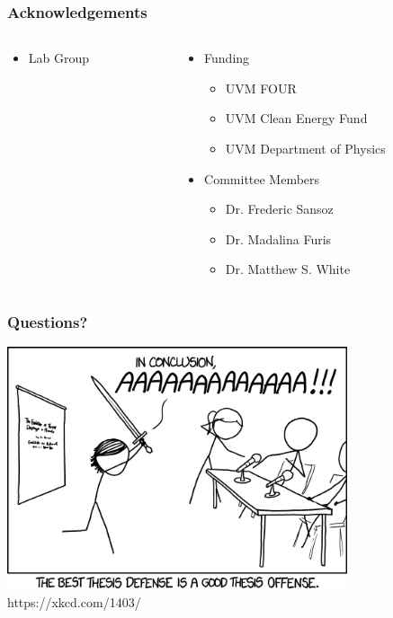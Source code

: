 \documentclass{beamer}
\begin{document}
    \begin{frame}
        \frametitle{Acknowledgements}
        \begin{columns}
			\begin{column}{0.4\textwidth}
				\begin{itemize}
					\item Lab Group
				\end{itemize}
			\end{column}
			\begin{column}{0.6\textwidth}
				\begin{itemize}
					\item Funding
					\begin{itemize}
						\item UVM FOUR
						\item UVM Clean Energy Fund
						\item UVM Department of Physics
					\end{itemize}
					\vspace{1cm}
					\item Committee Members
					\begin{itemize}
						\item Dr. Frederic Sansoz
						\item Dr. Madalina Furis
						\item Dr. Matthew S. White
					\end{itemize}
				\end{itemize}
			\end{column}
        \end{columns}
    \end{frame}
    
    \begin{frame}
        \frametitle{Questions?}
        \centering
        \includegraphics[width=0.75\textwidth]{images/xkcd.png}\\
        \tiny https://xkcd.com/1403/
    \end{frame}
    
\end{document}
